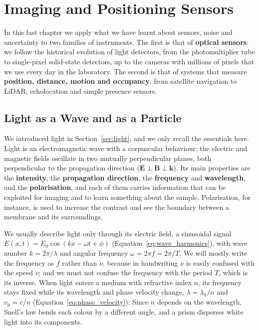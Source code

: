 \documentclass[letterpaper,11pt,leqno]{book}
\begin{document}
\chapter{Imaging and Positioning Sensors}
\label{ch:imaging}

In this last chapter we apply what we have learnt about sensors, noise and uncertainty to two families of instruments. The first is that of \textbf{optical sensors}: we follow the historical evolution of light detectors, from the photomultiplier tube to single-pixel solid-state detectors, up to the cameras with millions of pixels that we use every day in the laboratory. The second is that of systems that measure \textbf{position, distance, motion and occupancy}, from satellite navigation to LiDAR, echolocation and simple presence sensors.

\section{Light as a Wave and as a Particle}
\label{sec:light_review}

We introduced light in Section~\ref{sec:light}, and we only recall the essentials here. Light is an electromagnetic wave with a corpuscular behaviour: the electric and magnetic fields oscillate in two mutually perpendicular planes, both perpendicular to the propagation direction ($\mathbf{E} \perp \mathbf{B} \perp \mathbf{k}$). Its main properties are the \textbf{intensity}, the \textbf{propagation direction}, the \textbf{frequency} and \textbf{wavelength}, and the \textbf{polarisation}, and each of them carries information that can be exploited for imaging and to learn something about the sample. Polarisation, for instance, is used to increase the contrast and see the boundary between a membrane and its surroundings.

We usually describe light only through its electric field, a sinusoidal signal $E(x,t) = E_0\cos(kx - \omega t + \phi)$ (Equation~\eqref{eq:wave_harmonics}), with wave number $k = 2\pi/\lambda$ and angular frequency $\omega = 2\pi f = 2\pi/T$. We will mostly write the frequency as $f$ rather than $\nu$, because in handwriting $\nu$ is easily confused with the speed $v$; and we must not confuse the frequency with the period $T$, which is its inverse. When light enters a medium with refractive index $n$, its frequency stays fixed while its wavelength and phase velocity change, $\lambda = \lambda_0/n$ and $v_{\text{p}} = c/n$ (Equation~\eqref{eq:phase_velocity}). Since $n$ depends on the wavelength, Snell's law bends each colour by a different angle, and a prism disperses white light into its components.
\end{document}
